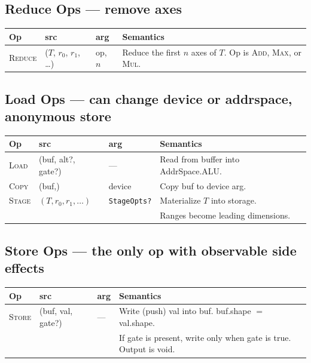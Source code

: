 \documentclass[10pt,letterpaper]{article}
\newcommand{\op}[1]{\textsc{#1}}
\begin{document}
\subsection*{{\color{reducered}Reduce Ops} \normalfont\small--- remove axes}

\begin{tabular}{@{}l l l l@{}}
\toprule
\textbf{Op} & \textbf{src} & \textbf{arg} & \textbf{Semantics} \\
\midrule
\op{Reduce} & ($T$, $r_0$, $r_1$, \ldots) & op, $n$ & Reduce the first $n$ axes of $T$. Op is \op{Add}, \op{Max}, or \op{Mul}. \\
\bottomrule
\end{tabular}

\subsection*{{\color{loadred}Load Ops} \normalfont\small--- can change device or addrspace, anonymous store}

\begin{tabular}{@{}l l l l@{}}
\toprule
\textbf{Op} & \textbf{src} & \textbf{arg} & \textbf{Semantics} \\
\midrule
\op{Load} & (buf, alt?, gate?) & --- & Read from buffer into AddrSpace.ALU. \\
\op{Copy} & (buf,) & device & Copy buf to device arg. \\
\op{Stage} & $(T, r_0, r_1, \ldots)$ & \texttt{StageOpts?} & Materialize $T$ into storage. \\
  & & & Ranges become leading dimensions. \\
\bottomrule
\end{tabular}

\subsection*{{\color{multipurple}Store Ops} \normalfont\small--- the only op with observable side effects}

\begin{tabular}{@{}l l l l@{}}
\toprule
\textbf{Op} & \textbf{src} & \textbf{arg} & \textbf{Semantics} \\
\midrule
\op{Store} & (buf, val, gate?) & --- & Write (push) val into buf. buf.shape $=$ val.shape. \\
  & & & If gate is present, write only when gate is true. Output is void. \\
\bottomrule
\end{tabular}
\end{document}
